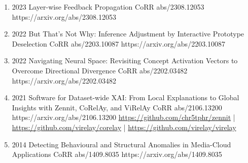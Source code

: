 {\begin{enumerate}
        \item {}
                        {2023}
                        {Layer-wise Feedback Propagation}
                        {CoRR abs/2308.12053}
                        {https://arxiv.org/abs/2308.12053}

        \item {}
                        {2022}
                        {But That's Not Why: Inference Adjustment by Interactive Prototype Deselection}
                        {CoRR abs/2203.10087}
                        {https://arxiv.org/abs/2203.10087}

        \item {}
                        {2022}
                        {Navigating Neural Space: Revisiting Concept Activation Vectors to Overcome Directional Divergence}
                        {CoRR abs/2202.03482}
                        {https://arxiv.org/abs/2202.03482}

        \item {}
                        {2021}
                        {Software for Dataset-wide XAI: From Local Explanations to Global Insights with Zennit, CoRelAy, and ViRelAy}
                        {CoRR abs/2106.13200}
                        {https://arxiv.org/abs/2106.13200}
                        {   \href{https://github.com/chr5tphr/zennit}{https://github.com/chr5tphr/zennit} | \\
                            \href{https://github.com/virelay/corelay}{https://github.com/virelay/corelay} |
                            \href{https://github.com/virelay/virelay}{https://github.com/virelay/virelay}
                        }

        \item {}
                        {2014}
                        {Detecting Behavioural and Structural Anomalies in Media-Cloud Applications}
                        {CoRR abs/1409.8035}
                        {https://arxiv.org/abs/1409.8035}

    \end{enumerate}

}
